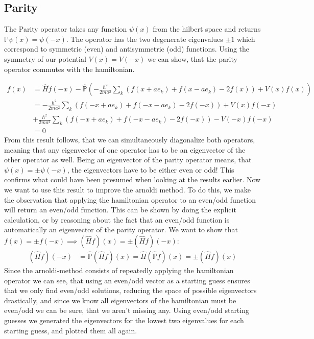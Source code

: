 \documentclass[11pt, letterpaper, onecolumn]{article}
\begin{document}
	\subsection{Parity}
 	The Parity operator takes any function $\psi(x)$ from the hilbert space and returns $\mathbb{P}\psi(x)=\psi(-x)$. The operator has the two degenerate eigenvalues $\pm1$ which correspond to symmetric (even) and antisymmetric (odd) functions. Using the symmetry of our potential $V(x)=V(-x)$ we can show, that the parity operator commutes with the hamiltonian.

  	\begin{align*}
		[\hat{H},\hat{\mathbb{P}}]f(x)&=\hat{H}f(-x)-\hat{\mathbb{P}}\left(-\frac{\hbar^2}{2ma^2}\sum\limits_k\left(f(x+ae_k)+f(x-ae_k)-2f(x)\right)+V(x)f(x) \right)\\
	    &=-\frac{\hbar^2}{2ma^2}\sum\limits_k\left(f(-x+ae_k)+f(-x-ae_k)-2f(-x)\right)+V(x)f(-x)\\&+\frac{\hbar^2}{2ma^2}\sum\limits_k\left(f(-x+ae_k)+f(-x-ae_k)-2f(-x)\right)-V(-x)f(-x)\\
	    &=0
	\end{align*}
 	From this result follows, that we can simultaneously diagonalize both operators, meaning that any eigenvector of one operator has to be an eigenvector of the other operator as well. Being an eigenvector of the parity operator means, that $\psi(x)=\pm\psi(-x)$, the eigenvectors have to be either even or odd! This confirms what could have been presumed when looking at the results earlier.
	Now we want to use this result to improve the arnoldi method. To do this, we make the observation that applying the hamiltonian operator to an even/odd function will return an even/odd function. This can be shown by doing the explicit calculation, or by reasoning about the fact that an even/odd function is automatically an eigenvector of the parity operator. We want to show that $f(x)=\pm f(-x)\implies (\hat{H}f)(x)=\pm(\hat{H}f)(-x)$:
 	\begin{align*}
    		(\hat{H}f)(-x)&=\hat{\mathbb{P}}(\hat{H}f)(x)=\hat{H}(\hat{\mathbb{P}}f)(x)=\pm(\hat{H}f)(x)
	\end{align*}
 	Since the arnoldi-method consists of repeatedly applying the hamiltonian operator we can see, that using an even/odd vector as a starting guess ensures that we only find even/odd solutions, reducing the space of possible eigenvectors drastically, and since we know all eigenvectors of the hamiltonian must be even/odd we can be sure, that we aren't missing any. Using even/odd starting guesses we generated the eigenvectors for the lowest two eigenvalues for each starting guess, and plotted them all again.
\end{document}
